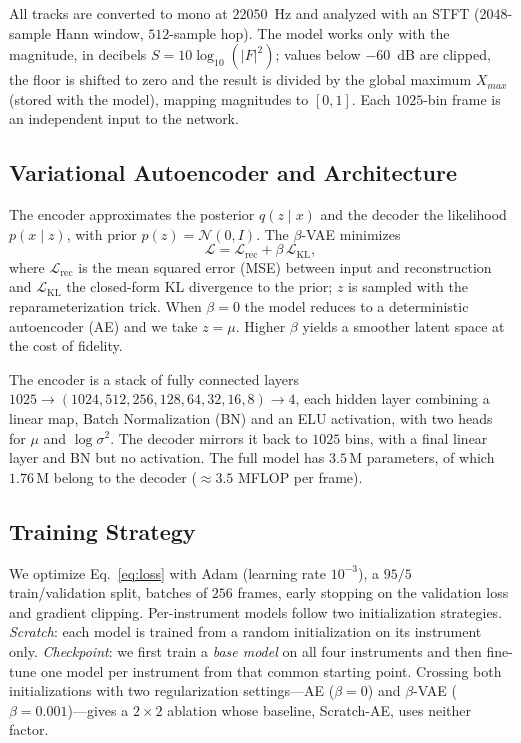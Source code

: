 \documentclass{article}
\begin{document}
All tracks are converted to mono at $22050$~Hz and analyzed with an STFT
($2048$-sample Hann window, $512$-sample hop). The model works only with the
magnitude, in decibels $S = 10\log_{10}(|F|^2)$; values below $-60$~dB are
clipped, the floor is shifted to zero and the result is divided by the global
maximum $X_{max}$ (stored with the model), mapping magnitudes to $[0,1]$. Each
$1025$-bin frame is an independent input to the network.

\subsection{Variational Autoencoder and Architecture}
The encoder approximates the posterior $q(z\mid x)$ and the decoder the
likelihood $p(x\mid z)$, with prior $p(z)=\mathcal{N}(0,I)$. The $\beta$-VAE
\cite{higgins2017beta} minimizes
\begin{equation}\label{eq:loss}
\mathcal{L} = \mathcal{L}_{\mathrm{rec}} + \beta\,\mathcal{L}_{\mathrm{KL}},
\end{equation}
where $\mathcal{L}_{\mathrm{rec}}$ is the mean squared error (MSE) between input
and reconstruction and $\mathcal{L}_{\mathrm{KL}}$ the closed-form KL divergence
to the prior; $z$ is sampled with the reparameterization trick. When $\beta=0$
the model reduces to a deterministic autoencoder (AE) and we take $z=\mu$.
Higher $\beta$ yields a smoother latent space at the cost of fidelity.

The encoder is a stack of fully connected layers
$1025\!\rightarrow\!(1024,512,256,128,64,32,16,8)\!\rightarrow\!4$, each hidden
layer combining a linear map, Batch Normalization (BN) and an ELU activation,
with two heads for $\mu$ and $\log\sigma^2$. The decoder mirrors it back to
$1025$ bins, with a final linear layer and BN but no activation. The full model
has $3.5$\,M parameters, of which $1.76$\,M belong to the decoder ($\approx3.5$
MFLOP per frame).

\subsection{Training Strategy}
We optimize Eq.~\eqref{eq:loss} with Adam (learning rate $10^{-3}$), a $95/5$
train/validation split, batches of $256$ frames, early stopping on the
validation loss and gradient clipping. Per-instrument models follow two
initialization strategies. \emph{Scratch}: each model is trained from a random
initialization on its instrument only. \emph{Checkpoint}: we first train a
\emph{base model} on all four instruments and then fine-tune one model per
instrument from that common starting point. Crossing both initializations with
two regularization settings---AE ($\beta=0$) and $\beta$-VAE
($\beta=0.001$)---gives a $2\times2$ ablation whose baseline, Scratch-AE, uses
neither factor.
\end{document}
